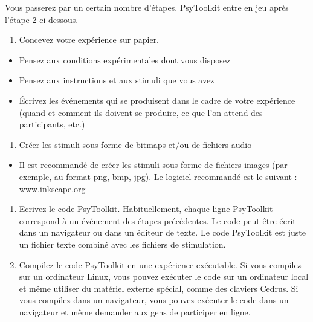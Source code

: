 \documentclass[
]{book}
\providecommand{\tightlist}{%
  \setlength{\itemsep}{0pt}\setlength{\parskip}{0pt}}
\begin{document}
Vous passerez par un certain nombre d'étapes. PsyToolkit entre en jeu
après l'étape 2 ci-dessous.

\begin{enumerate}
\def\labelenumi{\arabic{enumi}.}
\tightlist
\item
  Concevez votre expérience sur papier.
\end{enumerate}

\begin{itemize}
\tightlist
\item
  Pensez aux conditions expérimentales dont vous disposez
\item
  Pensez aux instructions et aux stimuli que vous avez
\item
  Écrivez les événements qui se produisent dans le cadre de votre
  expérience (quand et comment ils doivent se produire, ce que l'on
  attend des participants, etc.)
\end{itemize}

\begin{enumerate}
\def\labelenumi{\arabic{enumi}.}
\setcounter{enumi}{1}
\tightlist
\item
  Créer les stimuli sous forme de bitmaps et/ou de fichiers audio
\end{enumerate}

\begin{itemize}
\tightlist
\item
  Il est recommandé de créer les stimuli sous forme de fichiers images
  (par exemple, au format png, bmp, jpg). Le logiciel recommandé est le
  suivant : \url{www.inkscape.org}
\end{itemize}

\begin{enumerate}
\def\labelenumi{\arabic{enumi}.}
\setcounter{enumi}{2}
\item
  Ecrivez le code PsyToolkit. Habituellement, chaque ligne PsyToolkit
  correspond à un événement des étapes précédentes. Le code peut être
  écrit dans un navigateur ou dans un éditeur de texte. Le code
  PsyToolkit est juste un fichier texte combiné avec les fichiers de
  stimulation.
\item
  Compilez le code PsyToolkit en une expérience exécutable. Si vous
  compilez sur un ordinateur Linux, vous pouvez exécuter le code sur un
  ordinateur local et même utiliser du matériel externe spécial, comme
  des claviers Cedrus. Si vous compilez dans un navigateur, vous pouvez
  exécuter le code dans un navigateur et même demander aux gens de
  participer en ligne.
\end{enumerate}
\end{document}
